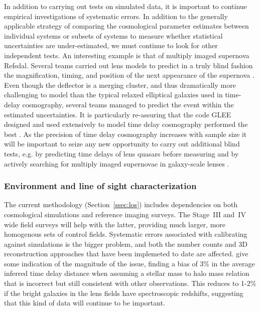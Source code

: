 In addition to carrying out tests on simulated data, it is important
to continue empirical investigations of systematic errors. In addition
to the generally applicable strategy of comparing the cosmological
parameter estimates between individual systems or subsets of systems
to measure whether statistical uncertainties are under-estimated, we
must continue to look for other independent tests. An interesting
example is that of multiply imaged supernova Refsdal. Several teams
carried out lens models to predict in a truly blind fashion the
magnification, timing, and position of the next appearance of the
supernova \citep{Ogu15,S+J16,Jau++16,Tre++16,Kaw++16,Gri++16}. Even
though the deflector is a merging cluster, and thus dramatically more
challenging to model than the typical relaxed elliptical galaxies used
in time-delay cosmography, several teams managed to predict the event
\citep{Tre++16,Kel++16}  within the estimated uncertainties.  
It is particularly re-assuring that the code GLEE designed and used
extensively to model time delay cosmography
\citep{Suy++10,Suy++13,Suy++14} performed the best
\citep{Gri++16}. As the precision of time delay cosmography increases
with sample size it will be important to seize any new opportunity to
carry out additional blind tests, e.g. by predicting time delays of
lens quasars before measuring and by actively searching for multiply
imaged supernovae in galaxy-scale lenses \citep{O+M10}.


\subsubsection{Environment and line of sight characterization}

The current methodology (Section~\ref{ssec:los}) includes dependencies
on both cosmological simulations and reference imaging surveys. The
Stage~III and~IV wide field surveys will help with the latter,
providing much larger, more homogenous sets of control fields.
Systematic errors associated with calibrating against simulations is
the bigger problem, and both the number counts and 3D reconstruction
approaches that have been implemeted to date are affected.
\citet{CollettEtal2013} give some indication of the magnitude of the
issue, finding a bias of 3\% in the average inferred time delay distance
when assuming a stellar mass to halo mass relation that is incorrect
but still consistent with other observations. This reduces to 1-2\%
if the bright galaxies in the lens fields have spectroscopic redshifts,
suggesting that this kind of data will continue to be important.

